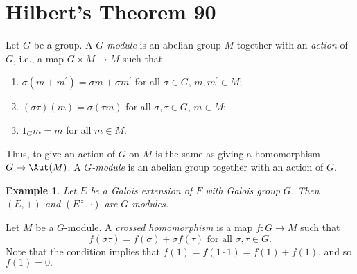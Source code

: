 \documentclass[a4paper,11pt,final,openany]{memoir}
\newtheorem{example}[X]{Example}
\theoremstyle{nonumberplain}
\begin{document}
\section{Hilbert's Theorem 90}

Let $G$ be a group. A $G$\emph{-module\/}%
is an abelian group $M$ together with an
%
\emph{action} of $G$, i.e., a map $G\times M\rightarrow M$ such that

\begin{enumerate}
\item $\sigma(m+m^{\prime})=\sigma m+\sigma m^{\prime}$ for all $\sigma\in G$,
$m,m^{\prime}\in M$;

\item $(\sigma\tau)(m)=\sigma(\tau m)$ for all $\sigma,\tau\in G$, $m\in M$;

\item $1_{G}m=m$ for all $m\in M$.
\end{enumerate}

\noindent Thus, to give an action of $G$ on $M$ is the same as giving a
homomorphism $G\rightarrow\Aut(M)$. A
%
$G$\emph{-module} is an abelian group together with an action of $G$.

\begin{example}
\label{ag15}Let $E$ be a Galois extension of $F$ with Galois group $G$. Then
$(E,+)$ and $(E^{\times},\cdot)$ are $G$-modules.
\end{example}

Let $M$ be a $G$-module. A \emph{crossed homomorphism\/}%
is a map $f\colon G\rightarrow M$ such that
\[
f(\sigma\tau)=f(\sigma)+\sigma f(\tau)\text{ for all }\sigma,\tau\in G\text{.}%
\]
Note that the condition implies that $f(1)=f(1\cdot1)=f(1)+f(1)$, and so
$f(1)=0.$
\end{document}
